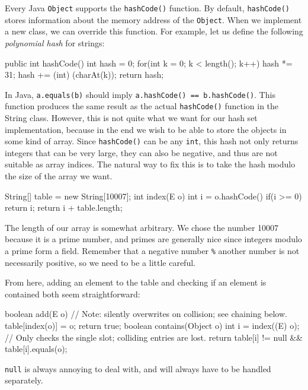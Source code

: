 Every Java \texttt{Object} supports the \texttt{hashCode()} function. By default, \texttt{hashCode()} stores information about the memory address of the \texttt{Object}. When we implement a new class, we can override this function. For example, let us define the following \textit{polynomial hash} for strings:

\begin{mylstlisting}
public int hashCode() {
	int hash = 0;
    for(int k = 0; k < length(); k++) {
		hash *= 31;
        hash += (int) (charAt(k));
    }
    return hash;
}
\end{mylstlisting}

In Java, \texttt{a.equals(b)} should imply \texttt{a.hashCode() == b.hashCode()}. This function produces the same result as the actual \texttt{hashCode()} function in the String class. However, this is not quite what we want for our hash set implementation, because in the end we wish to be able to store the objects in some kind of array. Since \texttt{hashCode()} can be any \texttt{int}, this hash not only returns integers that can be very large, they can also be negative, and thus are not suitable as array indices. The natural way to fix this is to take the hash modulo the size of the array we want.

\begin{mylstlisting}
String[] table = new String[10007];
int index(E o) {
	int i = o.hashCode() %
    if(i >= 0)
    	return i;
	return i + table.length;
}
\end{mylstlisting}

The length of our array is somewhat arbitrary. We chose the number 10007 because it is a prime number, and primes are generally nice since integers modulo a prime form a field. Remember that a negative number \texttt{\%} another number is not necessarily positive, so we need to be a little careful.

From here, adding an element to the table and checking if an element is contained both seem straightforward:

\begin{mylstlisting}
boolean add(E o) {
	// Note: silently overwrites on collision; see chaining below.
	table[index(o)] = o;
    return true;
}
boolean contains(Object o) {
    int i = index((E) o);
    // Only checks the single slot; colliding entries are lost.
	return table[i] != null && table[i].equals(o);
}
\end{mylstlisting}

\texttt{null} is always annoying to deal with, and will always have to be handled separately.

